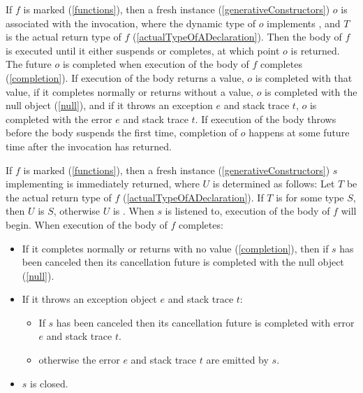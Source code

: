 \documentclass{article}
\begin{document}
\LMHash{}
If $f$ is marked \ASYNC{} (\ref{functions}),
then a fresh instance (\ref{generativeConstructors}) $o$ is associated with the invocation,
where the dynamic type of $o$ implements ,
and $T$ is the actual return type of $f$ (\ref{actualTypeOfADeclaration}).
Then the body of $f$ is executed until it either suspends or completes, at which point $o$ is returned.
The future $o$ is completed when execution of the body of $f$ completes (\ref{completion}).
If execution of the body returns a value, $o$ is completed with that value,
if it completes normally or returns without a value,
$o$ is completed with the null object (\ref{null}),
and if it throws an exception $e$ and stack trace $t$,
$o$ is completed with the error $e$ and stack trace $t$.
If execution of the body throws before the body suspends the first time,
completion of $o$ happens at some future time after the invocation has returned.

\LMHash{}
If $f$ is marked \ASYNC* (\ref{functions}),
then a fresh instance (\ref{generativeConstructors}) $s$
implementing  is immediately returned,
where $U$ is determined as follows:
Let $T$ be the actual return type of $f$ (\ref{actualTypeOfADeclaration}).
If $T$ is  for some type $S$, then $U$ is $S$,
otherwise $U$ is .
When $s$ is listened to, execution of the body of $f$ will begin.
When execution of the body of $f$ completes:
\begin{itemize}
\item If it completes normally or returns with no value (\ref{completion}), then if $s$ has been canceled then its cancellation future is completed with the null object (\ref{null}).
\item If it throws an exception object $e$ and stack trace $t$:
  \begin{itemize}
  \item If $s$ has been canceled then its cancellation future is completed with error $e$ and stack trace $t$.
  \item otherwise the error $e$ and stack trace $t$ are emitted by $s$.
  \end{itemize}
\item $s$ is closed.
\end{itemize}
\end{document}
